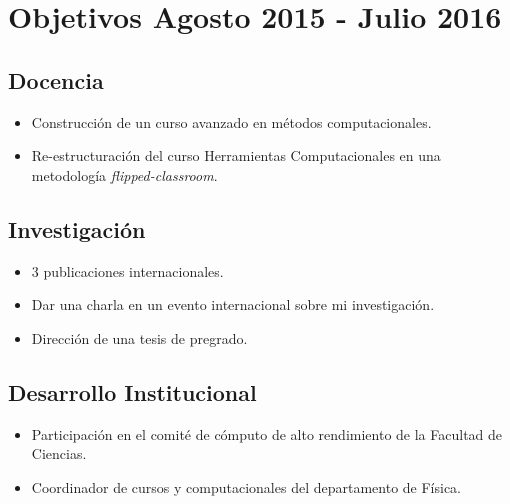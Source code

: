 \documentclass{article}
\begin{document}
\section{Objetivos Agosto 2015 - Julio 2016}


\subsection{Docencia}
\begin{itemize}
\item Construcci\'on de un curso avanzado en m\'etodos computacionales.
\item Re-estructuraci\'on del curso Herramientas Computacionales en
  una metodolog\'ia \emph{flipped-classroom}.
\end{itemize}


\subsection{Investigaci\'on}
\begin{itemize}
\item 3 publicaciones internacionales. 
\item Dar una charla en un evento internacional sobre mi
  investigaci\'on. 
\item Direcci\'on de una tesis de pregrado.
\end{itemize}

\subsection{Desarrollo Institucional}
\begin{itemize}
\item Participaci\'on en el comit\'e  de c\'omputo de alto rendimiento de la
Facultad de Ciencias.
\item Coordinador de cursos y computacionales del departamento de
  F\'isica. 
\end{itemize}
\end{document}
